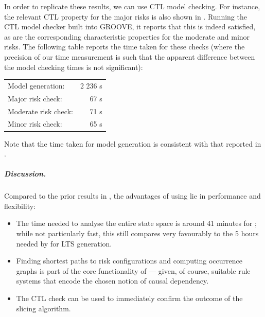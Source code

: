 In order to replicate these results, we can use CTL model checking. For instance, the relevant CTL property for the major risks is also shown in . Running the CTL model checker built into GROOVE, it reports that this is indeed satisfied, as are the corresponding characteristic properties for the moderate and minor risks. The following table reports the time taken for these checks (where the precision of our time measurement is such that the apparent difference between the model checking times is not significant):

\begin{center}
\begin{tabular}{lr}
Model generation: & 2 236 s \\
Major risk check: & 67 s \\
Moderate risk check: & 71 s \\
Minor risk check: & 65 s \\
\end{tabular}
\end{center}
%
Note that the time taken for model generation is consistent with that reported in .

\subparagraph*{Discussion.}

Compared to the prior results in \cite{DBLP:conf/cmsb/BowlesBBFGM24}, the advantages of using \GROOVE lie in performance and flexibility:
\begin{itemize}
\item The time needed to analyse the entire state space is around 41 minutes for \GROOVE; while not particularly fast, this still compares very favourably to the 5 hours needed by \BioResolve for LTS generation.

\item Finding shortest paths to risk configurations and computing occurrence graphs is part of the core functionality of \GROOVE --- given, of course, suitable rule systems that encode the chosen notion of causal dependency.

\item The CTL check can be used to immediately confirm the outcome of the slicing algorithm.
\end{itemize}
